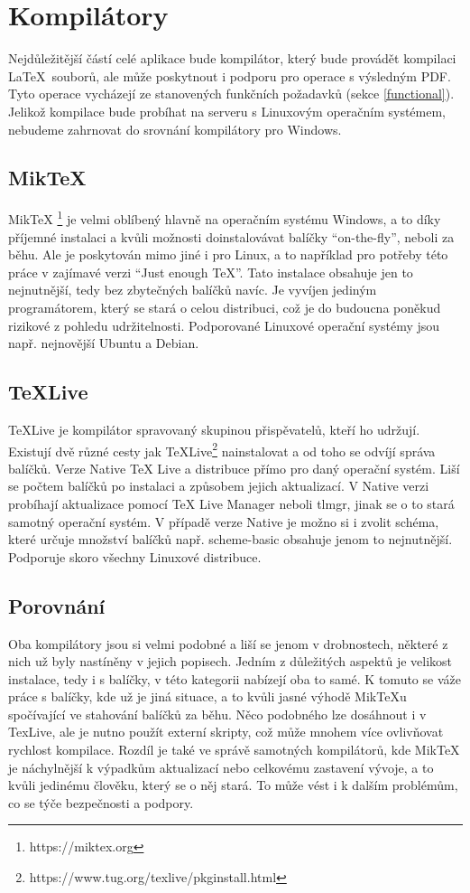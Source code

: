 \section{Kompilátory}
Nejdůležitější částí celé aplikace bude kompilátor, který bude provádět kompilaci \LaTeX\ souborů, ale může poskytnout i podporu pro operace s výsledným PDF. Tyto operace vycházejí ze stanovených funkčních požadavků (sekce \ref{functional}). Jelikož kompilace bude probíhat na serveru s Linuxovým operačním systémem, nebudeme zahrnovat do srovnání kompilátory pro Windows.

\subsection{MikTeX}
MikTeX \footnote{https://miktex.org} je velmi oblíbený hlavně na operačním systému Windows, a to díky příjemné instalaci a kvůli možnosti doinstalovávat balíčky \enquote{on-the-fly}, neboli za běhu. Ale je poskytován mimo jiné  i pro Linux, a to například pro potřeby této práce v zajímavé verzi \enquote{Just enough TeX}. Tato instalace obsahuje jen to nejnutnější, tedy bez zbytečných balíčků navíc. Je vyvíjen jediným programátorem, který se stará o celou distribuci, což je do budoucna poněkud rizikové z pohledu udržitelnosti. Podporované Linuxové operační systémy jsou např. nejnovější Ubuntu a Debian.

\subsection{TeXLive}
TeXLive je kompilátor spravovaný skupinou přispěvatelů, kteří ho udržují. Existují dvě různé cesty jak TeXLive\footnote{https://www.tug.org/texlive/pkginstall.html} nainstalovat a od toho se odvíjí správa balíčků. Verze Native TeX Live a distribuce přímo pro daný operační systém. Liší se počtem balíčků po instalaci a způsobem jejich aktualizací. V Native verzi probíhají aktualizace pomocí TeX Live Manager neboli tlmgr, jinak se o to stará samotný operační systém. V případě verze Native je možno si i zvolit schéma, které určuje množství balíčků např. scheme-basic obsahuje jenom to nejnutnější. Podporuje skoro všechny Linuxové distribuce.

\subsection{Porovnání} \label{compilator}
Oba kompilátory jsou si velmi podobné a liší se jenom v drobnostech, některé z nich už byly nastíněny v jejich popisech. Jedním z důležitých aspektů je velikost instalace, tedy i s balíčky, v této kategorii nabízejí oba to samé. K tomuto se váže práce s balíčky, kde už je jiná situace, a to kvůli jasné výhodě MikTeXu spočívající  ve stahování balíčků za běhu. Něco podobného lze dosáhnout i v TexLive, ale je nutno použít externí skripty, což může mnohem více ovlivňovat rychlost kompilace. 
Rozdíl je také ve správě samotných kompilátorů, kde MikTeX je náchylnější k výpadkům aktualizací nebo celkovému zastavení vývoje, a to kvůli jedinému člověku, který se o něj stará. To může vést i k dalším problémům, co se týče bezpečnosti a podpory.
